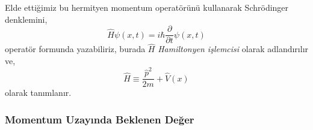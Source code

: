 \documentclass[a4paper,12pt, twoside]{article}
\begin{document}
Elde ettiğimiz bu hermityen momentum operatörünü kullanarak Schrödinger denklemini,
\begin{equation}
\hat H\psi(x,t) = i\hbar \dfrac{\partial}{\partial t}\psi(x,t)
\label{eq:schrodinger_operator_form}
\end{equation}
operatör formunda yazabiliriz, burada $\hat H$ \emph{Hamiltonyen işlemcisi} olarak adlandırılır ve,
\begin{equation}
\hat H \equiv \frac{\hat p^2}{2 m} + \hat V(x)
\label{eq:schrodinger_operator_form}
\end{equation}
olarak tanımlanır.

\subsubsection{Momentum Uzayında Beklenen Değer}
\end{document}
